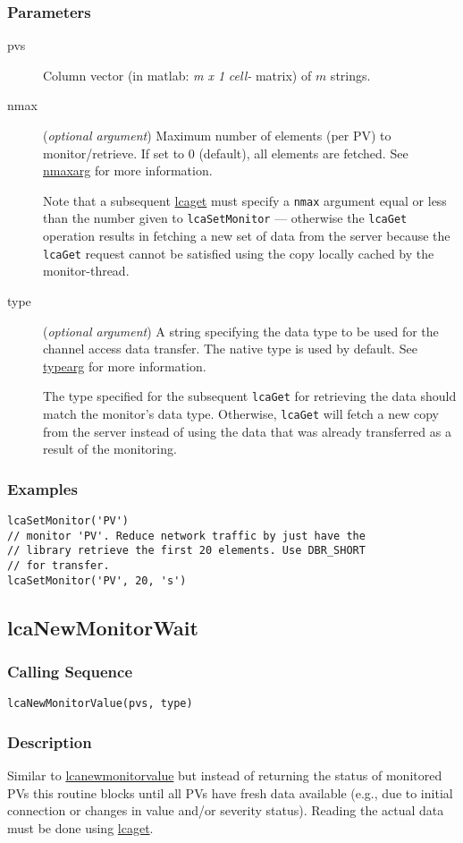 \documentclass{article}
\newcommand{\com}[1]{{\tt #1}}
\newcommand{\pbrk}{\pagebreak[3]}
\newcommand{\comref}[2]{\hyperref{\com{#1}}{\com{#1} (see }{)}{#2}}
\newcommand{\ita}[1]{\emph{#1}}
\newcommand{\m}{$m$}
\newcommand{\mhack}{$m$} %
\newcommand{\mxl}{$m\times 1$}
\renewcommand{\m}{\ita{m}}
\newcommand{\mhack}{\ita{m}} %
\renewcommand{\mxl}{\ita{m x 1}}
\renewcommand{\pbrk}{}
\newcommand{\PVITEM}{
\item[pvs] Column vector (in matlab: \mxl{} \ita{cell-} matrix)
of \mhack{} strings.
}
\begin{document}
\subsubsection{Parameters}
\begin{description}
\PVITEM
\item[nmax]
(\ita{optional argument}) Maximum number of elements
(per PV) to monitor/retrieve. If set to 0 (default), all elements are fetched.
See \hyperref{here}{(}{)}{nmaxarg} for more information.

Note that a subsequent \comref{lcaGet}{lcaget} must specify a \com{nmax}
argument equal or less than the number given to \com{lcaSetMonitor} ---
otherwise the \com{lcaGet} operation results in fetching a new
set of data from the server because the \com{lcaGet} request cannot
be satisfied using the copy locally cached by the monitor-thread.
\item[type]
(\ita{optional argument}) A string specifying the
data type to be used for the channel access data transfer. The
native type is used by default.
See \hyperref{here}{(}{)}{typearg} for more information.

The type specified for the subsequent \com{lcaGet} for retrieving
the data should match the monitor's data type. Otherwise, \com{lcaGet}
will fetch a new copy from the server instead of using the data that
was already transferred as a result of the monitoring.
\end{description}
\subsubsection{Examples}
\begin{verbatim}
lcaSetMonitor('PV')
// monitor 'PV'. Reduce network traffic by just have the
// library retrieve the first 20 elements. Use DBR_SHORT
// for transfer.
lcaSetMonitor('PV', 20, 's')
\end{verbatim}

\pbrk
\subsection{lcaNewMonitorWait}
\label{lcanewmonitorwait}
\subsubsection{Calling Sequence}
\begin{verbatim}
lcaNewMonitorValue(pvs, type)
\end{verbatim}
\subsubsection{Description}
Similar to \comref{lcaNewMonitorValue}{lcanewmonitorvalue} but instead of
returning the status of monitored PVs this routine blocks until all PVs
have fresh data available (e.g., due to initial connection or changes in
value and/or severity status).
Reading the actual data must be done using \comref{lcaGet}{lcaget}.
\end{document}
